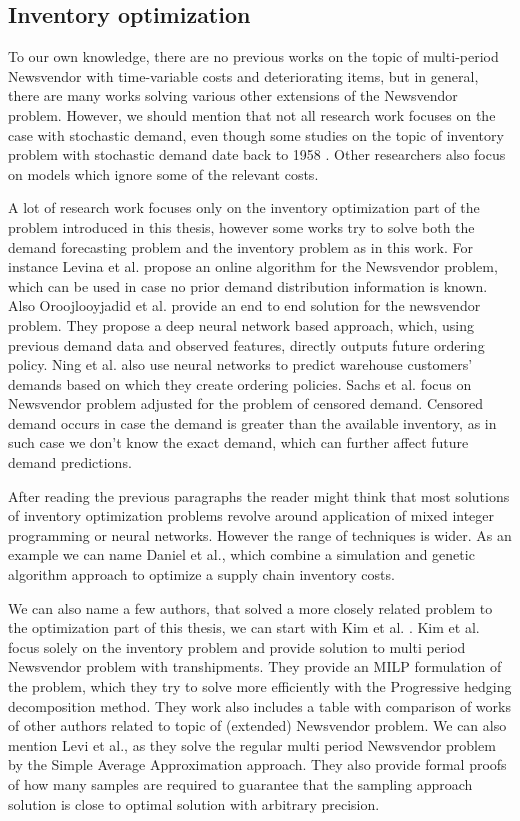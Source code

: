 \documentclass[11pt,a4paper]{article}
\begin{document}
\subsection{Inventory optimization}
To our own knowledge, there are no previous works on the topic of multi-period Newsvendor with time-variable costs and deteriorating items, but in general, there are many works solving various other extensions of the Newsvendor  problem.
However, we should mention that not all research work focuses on the case with stochastic demand, even though some studies on the topic of inventory problem with stochastic demand date back to 1958 \cite{scarf1958min}. Other researchers also focus on models which ignore some of the relevant costs.

A lot of research work focuses only on the inventory optimization part of the problem introduced in this thesis, however some works try to solve both the demand forecasting problem and the inventory problem as in this work. For instance Levina et al. \cite{levina2010weak} propose an online algorithm for the Newsvendor problem, which can be used in case no prior demand distribution information is known. Also Oroojlooyjadid et al. \cite{oroojlooyjadid2016applying} provide an end to end solution for the newsvendor problem. They propose a deep neural network based approach, which, using previous demand data and observed features, directly outputs future ordering policy. Ning et al. \cite{ning2009fulfillment} also use neural networks to predict warehouse customers' demands based on which they create ordering policies. Sachs et al. \cite{sachs2015data} focus on Newsvendor problem adjusted for the problem of censored demand. Censored demand occurs in case the demand is greater than the available inventory, as in such case we don't know the exact demand, which can further affect future demand predictions.


After reading the previous paragraphs the reader might think that most solutions of inventory optimization problems revolve around application of mixed integer programming or neural networks. However the range of techniques is wider. As an example we can name Daniel et al.\cite{daniel2005simulation}, which combine a simulation and genetic algorithm approach to optimize a supply chain inventory costs.

We can also name a few authors, that solved a more closely related problem to the optimization part of this thesis, we can start with Kim et al. \cite{kim2015optimal}.
Kim et al. focus solely on the inventory problem and provide solution to multi period Newsvendor problem
with transhipments. They provide an MILP formulation of the problem, which they try to solve more efficiently with the Progressive hedging decomposition method. They work also includes a table with comparison of works of other authors related to topic of (extended) Newsvendor problem.
We can also mention Levi et al., as \cite{levi2007provably} they solve the regular multi period Newsvendor problem by the Simple Average Approximation approach. They also provide formal proofs of how many samples are required to guarantee that the sampling approach solution is close to optimal solution with arbitrary precision.
\end{document}
